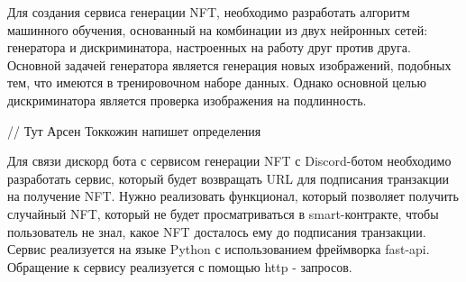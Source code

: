 Для создания сервиса генерации NFT, необходимо разработать алгоритм машинного обучения, основанный на комбинации из двух нейронных сетей: генератора и дискриминатора, настроенных на работу друг против друга. Основной задачей генератора является генерация новых изображений, подобных тем, что имеются в тренировочном наборе данных. Однако основной целью дискриминатора является проверка изображения на подлинность.

// Тут Арсен Токкожин напишет определения

Для связи дискорд бота с сервисом генерации NFT  с Discord-ботом необходимо разработать сервис, который будет возвращать URL для подписания транзакции на получение NFT. Нужно реализовать функционал, который позволяет получить случайный NFT, который не будет просматриваться в smart-контракте, чтобы пользователь не знал, какое NFT досталось ему до подписания транзакции. Сервис реализуется на языке Python с использованием фреймворка fast-api. Обращение к сервису реализуется с помощью http - запросов.

